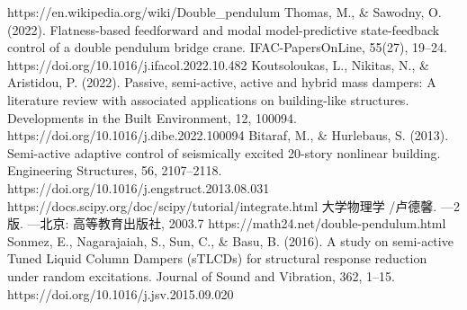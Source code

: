 \documentclass[10.5pt,a4paper]{ctexart}
\begin{document}
\noindent \begin{thebibliography}{99}
   {https://en.wikipedia.org/wiki/Double\_pendulum}
   {Thomas, M., \& Sawodny, O. (2022). Flatness-based feedforward and modal model-predictive state-feedback control of a double pendulum bridge crane. IFAC-PapersOnLine, 55(27), 19–24. https://doi.org/10.1016/j.ifacol.2022.10.482}
   {Koutsoloukas, L., Nikitas, N., \& Aristidou, P. (2022). Passive, semi-active, active and hybrid mass dampers: A literature review with associated applications on building-like structures. Developments in the Built Environment, 12, 100094. https://doi.org/10.1016/j.dibe.2022.100094}
   {Bitaraf, M., \& Hurlebaus, S. (2013). Semi-active adaptive control of seismically excited 20-story nonlinear building. Engineering Structures, 56, 2107–2118. https://doi.org/10.1016/j.engstruct.2013.08.031}
   {https://docs.scipy.org/doc/scipy/tutorial/integrate.html}
   {大学物理学 /卢德馨. ---2版. ---北京: 高等教育出版社, 2003.7}
	 {https://math24.net/double-pendulum.html}
   {Sonmez, E., Nagarajaiah, S., Sun, C., \& Basu, B. (2016). A study on semi-active Tuned Liquid Column Dampers (sTLCDs) for structural response reduction under random excitations. Journal of Sound and Vibration, 362, 1–15. https://doi.org/10.1016/j.jsv.2015.09.020}
\end{thebibliography}
\end{document}
